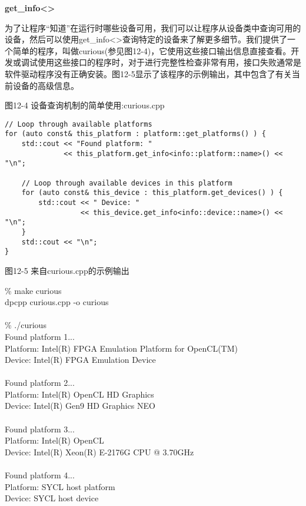 \hspace*{\fill} \par %
\textbf{get\_info<>}

为了让程序“知道”在运行时哪些设备可用，我们可以让程序从设备类中查询可用的设备，然后可以使用get\_info<>查询特定的设备来了解更多细节。我们提供了一个简单的程序，叫做curious(参见图12-4)，它使用这些接口输出信息直接查看。开发或调试使用这些接口的程序时，对于进行完整性检查非常有用，接口失败通常是软件驱动程序没有正确安装。图12-5显示了该程序的示例输出，其中包含了有关当前设备的高级信息。\par

\hspace*{\fill} \par %
图12-4 设备查询机制的简单使用:curious.cpp
\begin{lstlisting}[caption={}]
// Loop through available platforms
for (auto const& this_platform : platform::get_platforms() ) {
	std::cout << "Found platform: "
			  << this_platform.get_info<info::platform::name>() << "\n";
	
	// Loop through available devices in this platform
	for (auto const& this_device : this_platform.get_devices() ) {
		std::cout << " Device: "
				  << this_device.get_info<info::device::name>() << "\n";
	}
	std::cout << "\n";
}
\end{lstlisting}

\hspace*{\fill} \par %
图12-5 来自curious.cpp的示例输出
\begin{tcolorbox}[colback=white,colframe=black]
\% make curious \\
dpcpp curious.cpp -o curious\\
\\
\% ./curious \\
Found platform 1...\\
Platform: Intel(R) FPGA Emulation Platform for OpenCL(TM)\\
Device: Intel(R) FPGA Emulation Device\\
\\
Found platform 2...\\
Platform: Intel(R) OpenCL HD Graphics\\
Device: Intel(R) Gen9 HD Graphics NEO\\
\\
Found platform 3...\\
Platform: Intel(R) OpenCL\\
Device: Intel(R) Xeon(R) E-2176G CPU @ 3.70GHz\\
\\
Found platform 4...\\
Platform: SYCL host platform\\
Device: SYCL host device
\end{tcolorbox}

